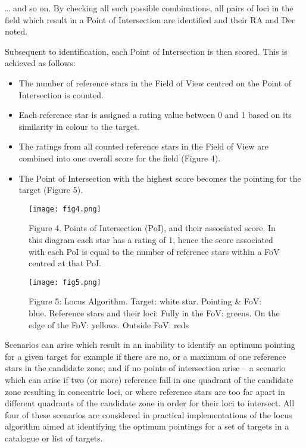 \documentclass[]{elsarticle} %
\makeatletter
\providecommand{\tightlist}{%
  \setlength{\itemsep}{0pt}\setlength{\parskip}{0pt}}
\def\maxwidth{\ifdim\Gin@nat@width>\linewidth\linewidth
\else\Gin@nat@width\fi}
\let\Oldincludegraphics\includegraphics
\renewcommand{\includegraphics}[1]{\Oldincludegraphics[width=\maxwidth]{#1}}
\makeatother
\begin{document}
\ldots{} and so on. By checking all such possible combinations, all
pairs of loci in the field which result in a Point of Intersection are
identified and their RA and Dec noted.

Subsequent to identification, each Point of Intersection is then scored.
This is achieved as follows:

\begin{itemize}
\tightlist
\item
  The number of reference stars in the Field of View centred on the
  Point of Intersection is counted.
\item
  Each reference star is assigned a rating value between 0 and 1 based
  on its similarity in colour to the target.
\item
  The ratings from all counted reference stars in the Field of View are
  combined into one overall score for the field (Figure 4).
\item
  The Point of Intersection with the highest score becomes the pointing
  for the target (Figure 5).
\end{itemize}

\begin{figure}
\centering
\texttt{[image: fig4.png]}
\caption{Figure 4. Points of Intersection (PoI), and their associated
score. In this diagram each star has a rating of 1, hence the score
associated with each PoI is equal to the number of reference stars
within a FoV centred at that PoI.}
\end{figure}

\begin{figure}
\centering
\texttt{[image: fig5.png]}
\caption{Figure 5: Locus Algorithm. Target: white star. Pointing \& FoV:
blue. Reference stars and their loci: Fully in the FoV: greens. On the
edge of the FoV: yellows. Outside FoV: reds}
\end{figure}

\newpage

Scenarios can arise which result in an inability to identify an optimum
pointing for a given target for example if there are no, or a maximum of
one reference stars in the candidate zone; and if no points of
intersection arise -- a scenario which can arise if two (or more)
reference fall in one quadrant of the candidate zone resulting in
concentric loci, or where reference stars are too far apart in different
quadrants of the candidate zone in order for their loci to intersect.
All four of these scenarios are considered in practical implementations
of the locus algorithm aimed at identifying the optimum pointings for a
set of targets in a catalogue or list of targets.
\end{document}
